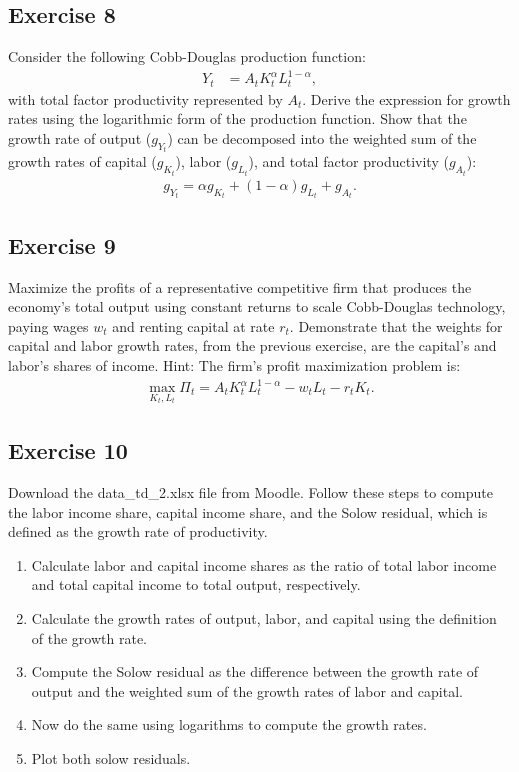 \documentclass[11pt]{article}
\begin{document}
\subsection*{Exercise 8}
Consider the following Cobb-Douglas production function:
\begin{align*}
    Y_t &= A_t K_t^\alpha L_t^{1-\alpha},
\end{align*}
with total factor productivity represented by \( A_t \). 
Derive the expression for growth rates using the logarithmic form of the production function. Show that the growth rate of output (\( g_{Y_t} \)) can be decomposed into the weighted sum of the growth rates of capital (\( g_{K_t} \)), labor (\( g_{L_t} \)), and total factor productivity (\( g_{A_t} \)):
\begin{align*}
    g_{Y_t} = \alpha g_{K_t} + (1-\alpha) g_{L_t} + g_{A_t}.    
\end{align*}

\subsection*{Exercise 9}
Maximize the profits of a representative competitive firm that 
produces the economy's total output using constant returns to scale 
Cobb-Douglas technology, paying wages \( w_t \) and renting capital at rate \( r_t \). 
Demonstrate that the weights for capital and labor growth rates, 
from the previous exercise, 
are the capital's and labor's shares of income.
Hint: The firm's profit maximization problem is:
\begin{align*}
    \max_{K_t, L_t} \Pi_t = A_t K_t^\alpha L_t^{1-\alpha} - w_t L_t - r_t K_t.
\end{align*}


\subsection*{Exercise 10}
Download the data\_td\_2.xlsx file from Moodle. 
Follow these steps to compute the labor income share, 
capital income share, and the Solow residual, which is 
defined as the growth rate of productivity.

\begin{enumerate}
    \item Calculate labor and capital income shares as the ratio of total labor 
    income and total capital income to total output, respectively.

    \item Calculate the growth rates of output, labor, and capital
    using the definition of the growth rate.
    \item Compute the Solow residual as the difference between the growth rate of
    output and the weighted sum of the growth rates of labor and capital.
    \item Now do the same using logarithms to compute the growth rates.
    \item Plot both solow residuals.
\end{enumerate}
\end{document}

